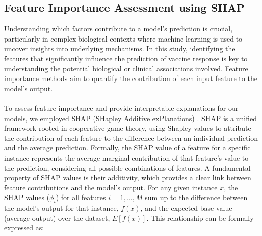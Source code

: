 \documentclass[12pt,a4paper]{report}
\newcommand{\todo}[1]{%
  \par\noindent%
  \begin{tcolorbox}[colback=yellow, colframe=black, boxrule=0.5pt, sharp corners, width=\linewidth, before skip=5pt, after skip=5pt]
    \textbf{TODO:} #1
  \end{tcolorbox}%
  \par
}
\begin{document}
\subsection{Feature Importance Assessment using SHAP}
\noindent
Understanding which factors contribute to a model's prediction is crucial, particularly in complex biological contexts where machine learning is used to uncover insights into underlying mechanisms. In this study, identifying the features that significantly influence the prediction of vaccine response is key to understanding the potential biological or clinical associations involved. Feature importance methods aim to quantify the contribution of each input feature to the model's output.\\
\\
To assess feature importance and provide interpretable explanations for our models, we employed SHAP (SHapley Additive exPlanations) \cite{ApprouchForModelPredictions}. SHAP is a unified framework rooted in cooperative game theory, using Shapley values to attribute the contribution of each feature to the difference between an individual prediction and the average prediction. Formally, the SHAP value of a feature for a specific instance represents the average marginal contribution of that feature's value to the prediction, considering all possible combinations of features. A fundamental property of SHAP values is their additivity, which provides a clear link between feature contributions and the model's output. For any given instance $x$, the SHAP values ($\phi_i$) for all features $i=1, \dots, M$ sum up to the difference between the model's output for that instance, $f(x)$, and the expected base value (average output) over the dataset, $E[f(x)]$. This relationship can be formally expressed as:
\end{document}
